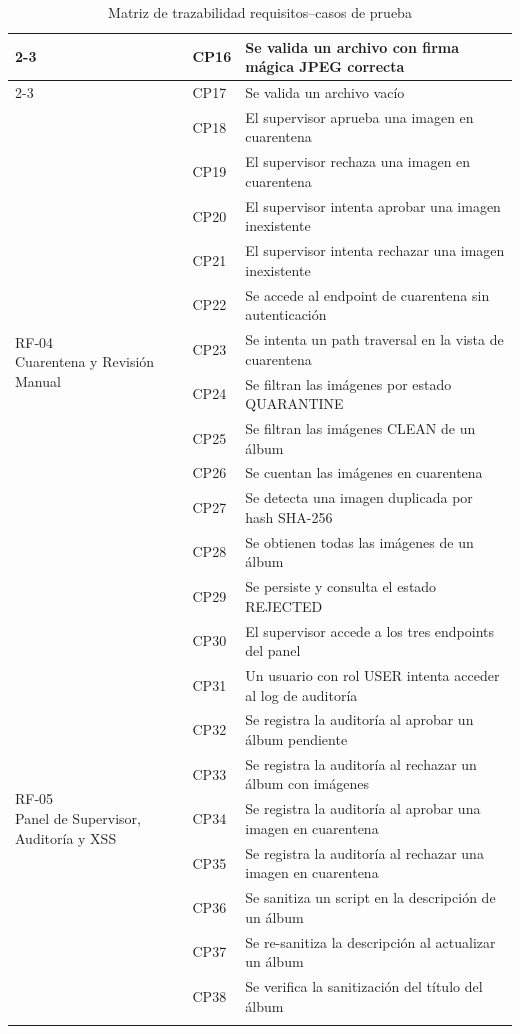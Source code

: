 \begin{longtable}{|p{2.2cm}|p{1.8cm}|p{10cm}|}
\cline{2-3}
 & CP16 & Se valida un archivo con firma mágica JPEG correcta \\
\cline{2-3}
 & CP17 & Se valida un archivo vacío \\
\hline
\multirow{12}{*}{\parbox{2cm}{RF-04\\Cuarentena y Revisión Manual}}
 & CP18 & El supervisor aprueba una imagen en cuarentena \\
\cline{2-3}
 & CP19 & El supervisor rechaza una imagen en cuarentena \\
\cline{2-3}
 & CP20 & El supervisor intenta aprobar una imagen inexistente \\
\cline{2-3}
 & CP21 & El supervisor intenta rechazar una imagen inexistente \\
\cline{2-3}
 & CP22 & Se accede al endpoint de cuarentena sin autenticación \\
\cline{2-3}
 & CP23 & Se intenta un path traversal en la vista de cuarentena \\
\cline{2-3}
 & CP24 & Se filtran las imágenes por estado QUARANTINE \\
\cline{2-3}
 & CP25 & Se filtran las imágenes CLEAN de un álbum \\
\cline{2-3}
 & CP26 & Se cuentan las imágenes en cuarentena \\
\cline{2-3}
 & CP27 & Se detecta una imagen duplicada por hash SHA-256 \\
\cline{2-3}
 & CP28 & Se obtienen todas las imágenes de un álbum \\
\cline{2-3}
 & CP29 & Se persiste y consulta el estado REJECTED \\
\hline
\multirow{9}{*}{\parbox{2cm}{RF-05\\Panel de Supervisor, Auditoría y XSS}}
 & CP30 & El supervisor accede a los tres endpoints del panel \\
\cline{2-3}
 & CP31 & Un usuario con rol USER intenta acceder al log de auditoría \\
\cline{2-3}
 & CP32 & Se registra la auditoría al aprobar un álbum pendiente \\
\cline{2-3}
 & CP33 & Se registra la auditoría al rechazar un álbum con imágenes \\
\cline{2-3}
 & CP34 & Se registra la auditoría al aprobar una imagen en cuarentena \\
\cline{2-3}
 & CP35 & Se registra la auditoría al rechazar una imagen en cuarentena \\
\cline{2-3}
 & CP36 & Se sanitiza un script en la descripción de un álbum \\
\cline{2-3}
 & CP37 & Se re-sanitiza la descripción al actualizar un álbum \\
\cline{2-3}
 & CP38 & Se verifica la sanitización del título del álbum \\
\hline
\caption{Matriz de trazabilidad requisitos--casos de prueba}
\label{tab:trazabilidad}
\end{longtable}

